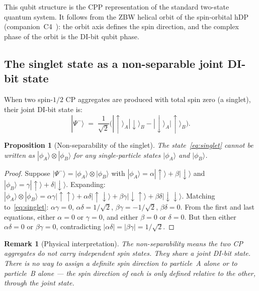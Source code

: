 \documentclass[11pt,a4paper]{article}
\newtheorem{proposition}[theorem]{Proposition}
\newtheorem{remark}[theorem]{Remark}
\begin{document}
This qubit structure is the CPP representation of the standard
two-state quantum system.  It follows from the ZBW helical orbit of
the spin-orbital hDP (companion~C4~\citep{abshier2026zbw}): the orbit
axis defines the spin direction, and the complex phase of the orbit
is the DI-bit qubit phase.

\subsection{The singlet state as a non-separable joint DI-bit state}

When two spin-$1/2$ CP aggregates are produced with total spin zero
(a singlet), their joint DI-bit state is:
\begin{equation}
|\Psi^-\rangle \;=\;
\frac{1}{\sqrt{2}}\bigl(|\!\uparrow\rangle_A|\!\downarrow\rangle_B
                       -|\!\downarrow\rangle_A|\!\uparrow\rangle_B\bigr).
\label{eq:singlet}
\end{equation}

\begin{proposition}[Non-separability of the singlet]
\label{prop:nonsep}
The state~\eqref{eq:singlet} cannot be written as $|\phi_A\rangle \otimes
|\phi_B\rangle$ for any single-particle states $|\phi_A\rangle$ and
$|\phi_B\rangle$.
\end{proposition}

\begin{proof}
Suppose $|\Psi^-\rangle = |\phi_A\rangle \otimes |\phi_B\rangle$ with
$|\phi_A\rangle = \alpha|\!\uparrow\rangle + \beta|\!\downarrow\rangle$
and $|\phi_B\rangle = \gamma|\!\uparrow\rangle + \delta|\!\downarrow\rangle$.
Expanding: $|\phi_A\rangle \otimes |\phi_B\rangle =
\alpha\gamma|\uparrow\uparrow\rangle + \alpha\delta|\uparrow\downarrow\rangle
+ \beta\gamma|\downarrow\uparrow\rangle + \beta\delta|\downarrow\downarrow\rangle$.
Matching to~\eqref{eq:singlet}: $\alpha\gamma = 0$, $\alpha\delta = 1/\sqrt{2}$,
$\beta\gamma = -1/\sqrt{2}$, $\beta\delta = 0$.
From the first and last equations, either $\alpha = 0$ or $\gamma = 0$, and
either $\beta = 0$ or $\delta = 0$.  But then either $\alpha\delta = 0$ or
$\beta\gamma = 0$, contradicting $|\alpha\delta| = |\beta\gamma| = 1/\sqrt{2}$.
\end{proof}

\begin{remark}[Physical interpretation]
The non-separability means the two CP aggregates do not carry
independent spin states.  They share a joint DI-bit state.  There
is no way to assign a definite spin direction to particle~A alone
or to particle~B alone --- the spin direction of each is only defined
relative to the other, through the joint state.
\end{remark}
\end{document}
